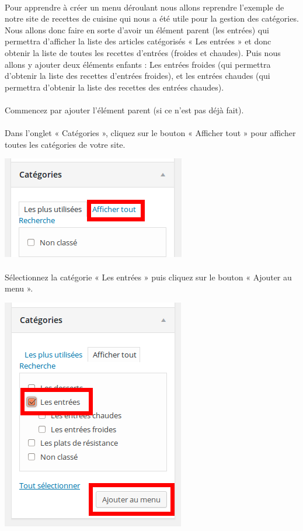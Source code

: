 \documentclass[10pt,a4paper]{article}
\begin{document}
\paragraph{}Pour apprendre à créer un menu déroulant nous allons reprendre l'exemple de notre site de recettes de cuisine qui nous a été utile pour la gestion des catégories. Nous allons donc faire en sorte d'avoir un élément parent (les entrées) qui permettra d'afficher la liste des articles catégorisés « Les entrées » et donc obtenir la liste de toutes les recettes d'entrées (froides et chaudes). Puis nous allons y ajouter deux éléments enfants : Les entrées froides (qui permettra d'obtenir la liste des recettes d'entrées froides), et les entrées chaudes (qui permettra d'obtenir la liste des recettes des entrées chaudes).
\paragraph{}Commencez par ajouter l'élément parent (si ce n'est pas déjà fait).
\paragraph{}Dans l'onglet « Catégories », cliquez sur le bouton « Afficher tout » pour afficher toutes les catégories de votre site.
\begin{center}
\includegraphics[scale=0.3]{img/0150.png}
\end{center}
\paragraph{}Sélectionnez la catégorie « Les entrées » puis cliquez sur le bouton « Ajouter au menu ».
\begin{center}
\includegraphics[scale=0.3]{img/0151.png}
\end{center}
\end{document}
